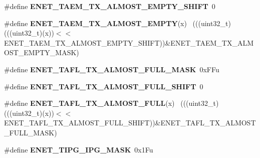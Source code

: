 \begin{DoxyCompactItemize}
\item 
\hypertarget{group___e_n_e_t___register___masks_ga7c41b19807f3598aa5cee0bf72c6c03f}{}\#define {\bfseries E\+N\+E\+T\+\_\+\+T\+A\+E\+M\+\_\+\+T\+X\+\_\+\+A\+L\+M\+O\+S\+T\+\_\+\+E\+M\+P\+T\+Y\+\_\+\+S\+H\+I\+F\+T}~0\label{group___e_n_e_t___register___masks_ga7c41b19807f3598aa5cee0bf72c6c03f}

\item 
\hypertarget{group___e_n_e_t___register___masks_ga7fafd05cfdc144934437c5bfedb080cb}{}\#define {\bfseries E\+N\+E\+T\+\_\+\+T\+A\+E\+M\+\_\+\+T\+X\+\_\+\+A\+L\+M\+O\+S\+T\+\_\+\+E\+M\+P\+T\+Y}(x)                      ~(((uint32\+\_\+t)(((uint32\+\_\+t)(x))$<$$<$E\+N\+E\+T\+\_\+\+T\+A\+E\+M\+\_\+\+T\+X\+\_\+\+A\+L\+M\+O\+S\+T\+\_\+\+E\+M\+P\+T\+Y\+\_\+\+S\+H\+I\+F\+T))\&E\+N\+E\+T\+\_\+\+T\+A\+E\+M\+\_\+\+T\+X\+\_\+\+A\+L\+M\+O\+S\+T\+\_\+\+E\+M\+P\+T\+Y\+\_\+\+M\+A\+S\+K)\label{group___e_n_e_t___register___masks_ga7fafd05cfdc144934437c5bfedb080cb}

\item 
\hypertarget{group___e_n_e_t___register___masks_gae28ae12fc0e108d7d8d82efce1d3d016}{}\#define {\bfseries E\+N\+E\+T\+\_\+\+T\+A\+F\+L\+\_\+\+T\+X\+\_\+\+A\+L\+M\+O\+S\+T\+\_\+\+F\+U\+L\+L\+\_\+\+M\+A\+S\+K}~0x\+F\+Fu\label{group___e_n_e_t___register___masks_gae28ae12fc0e108d7d8d82efce1d3d016}

\item 
\hypertarget{group___e_n_e_t___register___masks_ga8667ed29a0d85d764598142ed22744c9}{}\#define {\bfseries E\+N\+E\+T\+\_\+\+T\+A\+F\+L\+\_\+\+T\+X\+\_\+\+A\+L\+M\+O\+S\+T\+\_\+\+F\+U\+L\+L\+\_\+\+S\+H\+I\+F\+T}~0\label{group___e_n_e_t___register___masks_ga8667ed29a0d85d764598142ed22744c9}

\item 
\hypertarget{group___e_n_e_t___register___masks_ga6e0f786661268ecd58d9a78fefb30ed8}{}\#define {\bfseries E\+N\+E\+T\+\_\+\+T\+A\+F\+L\+\_\+\+T\+X\+\_\+\+A\+L\+M\+O\+S\+T\+\_\+\+F\+U\+L\+L}(x)                        ~(((uint32\+\_\+t)(((uint32\+\_\+t)(x))$<$$<$E\+N\+E\+T\+\_\+\+T\+A\+F\+L\+\_\+\+T\+X\+\_\+\+A\+L\+M\+O\+S\+T\+\_\+\+F\+U\+L\+L\+\_\+\+S\+H\+I\+F\+T))\&E\+N\+E\+T\+\_\+\+T\+A\+F\+L\+\_\+\+T\+X\+\_\+\+A\+L\+M\+O\+S\+T\+\_\+\+F\+U\+L\+L\+\_\+\+M\+A\+S\+K)\label{group___e_n_e_t___register___masks_ga6e0f786661268ecd58d9a78fefb30ed8}

\item 
\hypertarget{group___e_n_e_t___register___masks_ga762834c2d579052c47b81ddf501514e1}{}\#define {\bfseries E\+N\+E\+T\+\_\+\+T\+I\+P\+G\+\_\+\+I\+P\+G\+\_\+\+M\+A\+S\+K}~0x1\+Fu\label{group___e_n_e_t___register___masks_ga762834c2d579052c47b81ddf501514e1}


\end{DoxyCompactItemize}
